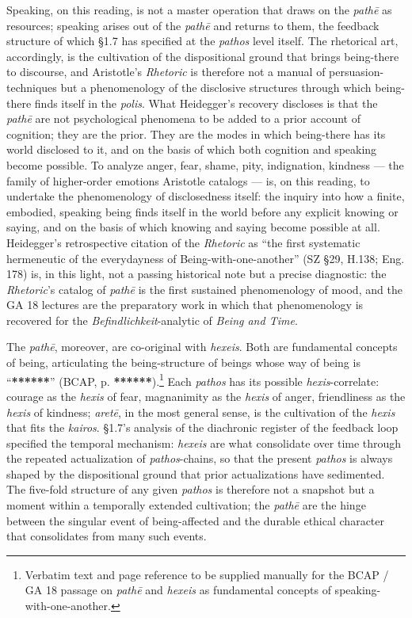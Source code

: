 Speaking, on this reading, is not a master operation that draws on the \textit{pathē} as resources; speaking arises out of the \textit{pathē} and returns to them, the feedback structure of which \S1.7 has specified at the \textit{pathos} level itself. The rhetorical art, accordingly, is the cultivation of the dispositional ground that brings being-there to discourse, and Aristotle's \textit{Rhetoric} is therefore not a manual of persuasion-techniques but a phenomenology of the disclosive structures through which being-there finds itself in the \textit{polis}. What Heidegger's recovery discloses is that the \textit{pathē} are not psychological phenomena to be added to a prior account of cognition; they are the prior. They are the modes in which being-there has its world disclosed to it, and on the basis of which both cognition and speaking become possible. To analyze anger, fear, shame, pity, indignation, kindness --- the family of higher-order emotions Aristotle catalogs --- is, on this reading, to undertake the phenomenology of disclosedness itself: the inquiry into how a finite, embodied, speaking being finds itself in the world before any explicit knowing or saying, and on the basis of which knowing and saying become possible at all. Heidegger's retrospective citation of the \textit{Rhetoric} as ``the first systematic hermeneutic of the everydayness of Being-with-one-another'' (SZ \S29, H.138; Eng. 178) is, in this light, not a passing historical note but a precise diagnostic: the \textit{Rhetoric}'s catalog of \textit{pathē} is the first sustained phenomenology of mood, and the GA 18 lectures are the preparatory work in which that phenomenology is recovered for the \textit{Befindlichkeit}-analytic of \textit{Being and Time}.

The \textit{pathē}, moreover, are co-original with \textit{hexeis}. Both are fundamental concepts of being, articulating the being-structure of beings whose way of being is ``\textbf{******}'' (BCAP, p. \textbf{******}).\footnote{Verbatim text and page reference to be supplied manually for the BCAP / GA 18 passage on \textit{pathē} and \textit{hexeis} as fundamental concepts of speaking-with-one-another.} Each \textit{pathos} has its possible \textit{hexis}-correlate: courage as the \textit{hexis} of fear, magnanimity as the \textit{hexis} of anger, friendliness as the \textit{hexis} of kindness; \textit{aretē}, in the most general sense, is the cultivation of the \textit{hexis} that fits the \textit{kairos}. \S1.7's analysis of the diachronic register of the feedback loop specified the temporal mechanism: \textit{hexeis} are what consolidate over time through the repeated actualization of \textit{pathos}-chains, so that the present \textit{pathos} is always shaped by the dispositional ground that prior actualizations have sedimented. The five-fold structure of any given \textit{pathos} is therefore not a snapshot but a moment within a temporally extended cultivation; the \textit{pathē} are the hinge between the singular event of being-affected and the durable ethical character that consolidates from many such events.

